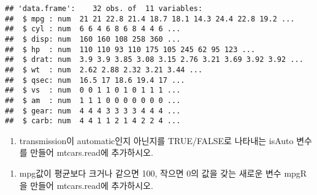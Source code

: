 \documentclass[]{article}
\newenvironment{Shaded}{\begin{snugshade}}{\end{snugshade}}
\newcommand{\KeywordTok}[1]{\textcolor[rgb]{0.13,0.29,0.53}{\textbf{#1}}}
\newcommand{\DecValTok}[1]{\textcolor[rgb]{0.00,0.00,0.81}{#1}}
\newcommand{\StringTok}[1]{\textcolor[rgb]{0.31,0.60,0.02}{#1}}
\newcommand{\CommentTok}[1]{\textcolor[rgb]{0.56,0.35,0.01}{\textit{#1}}}
\newcommand{\OtherTok}[1]{\textcolor[rgb]{0.56,0.35,0.01}{#1}}
\newcommand{\OperatorTok}[1]{\textcolor[rgb]{0.81,0.36,0.00}{\textbf{#1}}}
\newcommand{\NormalTok}[1]{#1}
\providecommand{\tightlist}{%
  \setlength{\itemsep}{0pt}\setlength{\parskip}{0pt}}
\begin{document}
\begin{verbatim}
## 'data.frame':    32 obs. of  11 variables:
##  $ mpg : num  21 21 22.8 21.4 18.7 18.1 14.3 24.4 22.8 19.2 ...
##  $ cyl : num  6 6 4 6 8 6 8 4 4 6 ...
##  $ disp: num  160 160 108 258 360 ...
##  $ hp  : num  110 110 93 110 175 105 245 62 95 123 ...
##  $ drat: num  3.9 3.9 3.85 3.08 3.15 2.76 3.21 3.69 3.92 3.92 ...
##  $ wt  : num  2.62 2.88 2.32 3.21 3.44 ...
##  $ qsec: num  16.5 17 18.6 19.4 17 ...
##  $ vs  : num  0 0 1 1 0 1 0 1 1 1 ...
##  $ am  : num  1 1 1 0 0 0 0 0 0 0 ...
##  $ gear: num  4 4 4 3 3 3 3 4 4 4 ...
##  $ carb: num  4 4 1 1 2 1 4 2 2 4 ...
\end{verbatim}

\begin{enumerate}
\def\labelenumi{\arabic{enumi})}
\setcounter{enumi}{5}
\tightlist
\item
  transmission이 automatic인지 아닌지를 TRUE/FALSE로 나타내는 isAuto
  변수를 만들어 mtcars.read에 추가하시오.
\end{enumerate}

\begin{Shaded}
\end{Shaded}

\begin{enumerate}
\def\labelenumi{\arabic{enumi})}
\setcounter{enumi}{6}
\tightlist
\item
  mpg값이 평균보다 크거나 같으면 100, 작으면 0의 값을 갖는 새로운 변수
  mpgR을 만들어 mtcars.read에 추가하시오.
\end{enumerate}

\begin{Shaded}
\end{Shaded}
\end{document}
